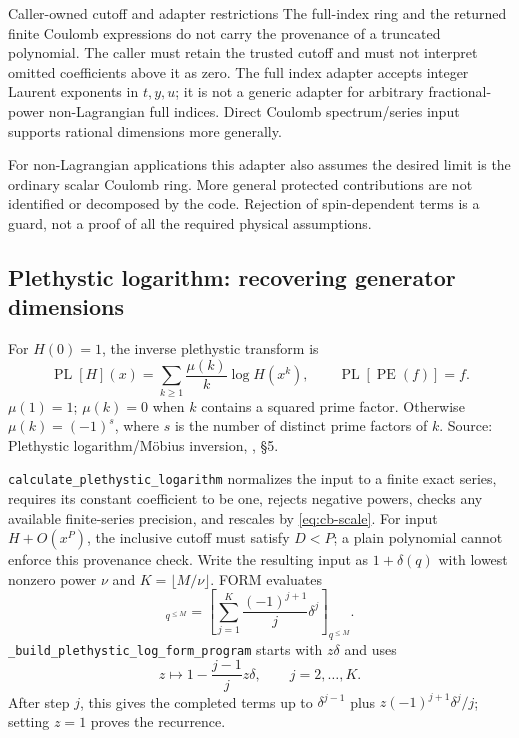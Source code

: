\documentclass[11pt,a4paper]{article}
\numberwithin{equation}{section}
\newcommand{\code}[1]{{\small\nolinkurl{#1}}}
\newcommand{\PE}{\operatorname{PE}}
\newcommand{\PL}{\operatorname{PL}}
\newcommand{\src}[1]{{\small\color{muted}Source: #1.}\par}
\begin{document}
\begin{note}{Caller-owned cutoff and adapter restrictions}
The full-index ring and the returned finite Coulomb expressions do not carry
the provenance of a truncated polynomial. The caller must retain the trusted
cutoff and must not interpret omitted coefficients above it as zero. The full
index adapter accepts integer Laurent exponents in $t,y,u$; it is not a generic
adapter for arbitrary fractional-power non-Lagrangian full indices. Direct
Coulomb spectrum/series input supports rational dimensions more generally.
\end{note}

For non-Lagrangian applications this adapter also assumes the desired limit is
the ordinary scalar Coulomb ring. More general protected contributions are not
identified or decomposed by the code. Rejection of spin-dependent terms is a
guard, not a proof of all the required physical assumptions.

\clearpage
\subsection{Plethystic logarithm: recovering generator dimensions}
For $H(0)=1$, the inverse plethystic transform is
\begin{equation}
 \PL[H](x)=\sum_{k\geq1}\frac{\mu(k)}k\log H(x^k),
 \qquad \PL[\PE(f)]=f.
 \label{eq:pl}
\end{equation}
$\mu(1)=1$; $\mu(k)=0$ when $k$ contains a squared prime factor. Otherwise
$\mu(k)=(-1)^s$, where $s$ is the number of distinct prime factors of $k$.
\src{Plethystic logarithm/M\"obius inversion, \cite{plethystics}, \S5}

\code{calculate_plethystic_logarithm} normalizes the input to a finite exact
series, requires its constant coefficient to be one, rejects negative powers,
checks any available finite-series precision, and rescales by
\eqref{eq:cb-scale}. For input $H+O(x^P)$, the inclusive cutoff must satisfy
$D<P$; a plain polynomial cannot enforce this provenance check.
Write the resulting input as $1+\delta(q)$ with lowest
nonzero power $\nu$ and $K=\lfloor M/\nu\rfloor$. FORM evaluates
\begin{equation}
 [\log(1+\delta)]_{q^{\leq M}}=
 \left[\sum_{j=1}^{K}\frac{(-1)^{j+1}}j\delta^j\right]_{q^{\leq M}}.
 \label{eq:ordinary-log}
\end{equation}
\code{_build_plethystic_log_form_program} starts with $z\delta$ and uses
\begin{equation}
 z\longmapsto1-\frac{j-1}{j}z\delta,
 \qquad j=2,\ldots,K.
 \label{eq:log-recursion}
\end{equation}
After step $j$, this gives the completed terms up to $\delta^{j-1}$ plus
$z(-1)^{j+1}\delta^j/j$; setting $z=1$ proves the recurrence.
\end{document}
